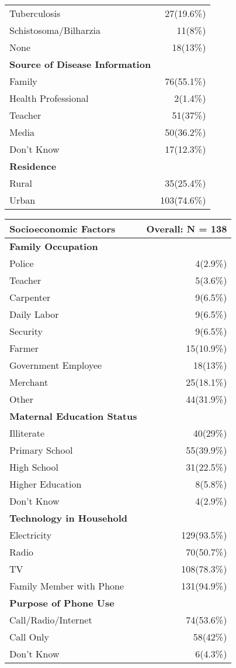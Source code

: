 \documentclass[4pt,letterpaper]{article}
\begin{document}
\begin{multicols}{2}
\begin{center}
\begin{tabular}{p{5cm}r}
Tuberculosis & 27(19.6\%) \\
Schistosoma/Bilharzia & 11(8\%) \\
None & 18(13\%) \\
\midrule
\textbf{Source of Disease Information} & \\
Family & 76(55.1\%) \\
Health Professional & 2(1.4\%) \\
Teacher & 51(37\%) \\
Media & 50(36.2\%) \\
Don't Know & 17(12.3\%) \\
\midrule
\textbf{Residence} & \\
Rural & 35(25.4\%) \\
Urban & 103(74.6\%) \\
\bottomrule
\end{tabular}
\end{center}

\begin{center}
\begin{tabular}{p{5cm}r}
\toprule
\textbf{Socioeconomic Factors} & \textbf{Overall: N = 138} \\
\midrule
\textbf{Family Occupation} & \\
Police & 4(2.9\%) \\
Teacher & 5(3.6\%) \\
Carpenter & 9(6.5\%) \\
Daily Labor & 9(6.5\%) \\
Security & 9(6.5\%) \\
Farmer & 15(10.9\%) \\
Government Employee & 18(13\%) \\
Merchant & 25(18.1\%) \\
Other & 44(31.9\%) \\
\midrule
\textbf{Maternal Education Status} & \\
Illiterate & 40(29\%) \\
Primary School & 55(39.9\%) \\
High School & 31(22.5\%) \\
Higher Education & 8(5.8\%) \\
Don't Know & 4(2.9\%) \\
\midrule
\textbf{Technology in Household} & \\
Electricity & 129(93.5\%) \\
Radio & 70(50.7\%) \\
TV & 108(78.3\%) \\
Family Member with Phone & 131(94.9\%) \\
\midrule
\textbf{Purpose of Phone Use} & \\
Call/Radio/Internet & 74(53.6\%) \\
Call Only & 58(42\%) \\
Don't Know & 6(4.3\%) \\
\bottomrule
\end{tabular}
\end{center}


\end{multicols}
\end{document}
